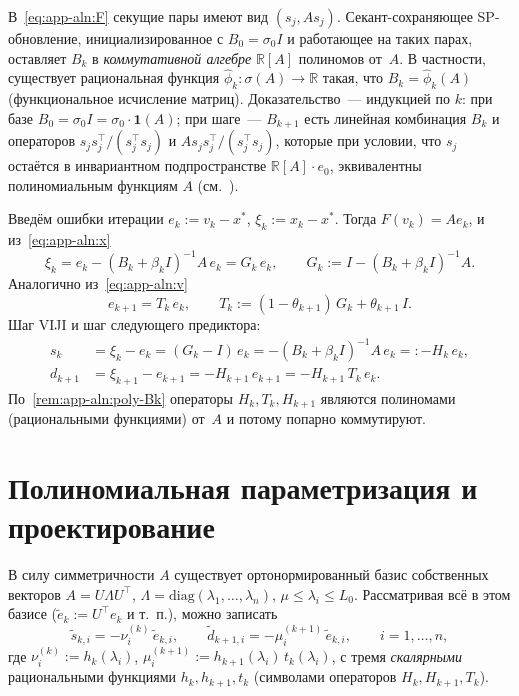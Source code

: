 \begin{remark}
\label{rem:app-aln:poly-Bk}
В~\eqref{eq:app-aln:F} секущие пары имеют вид $(s_j, A s_j)$.
Секант-сохраняющее SP-обновление,
ини\-циа\-ли\-зи\-ро\-ван\-ное с $B_0 = \sigma_0 I$
и работающее на таких парах, оставляет $B_k$ в \emph{коммутативной алгебре}
$\mathbb{R}[A]$ полиномов от~$A$. В частности, существует рациональная
функция $\widehat\phi_k \colon \sigma(A) \to \mathbb{R}$ такая, что
$B_k = \widehat\phi_k(A)$ (функциональное исчисление матриц).
Доказательство~--- индукцией по $k$: при базе $B_0 = \sigma_0 I = \sigma_0 \cdot \mathbf{1}(A)$;
при шаге~--- $B_{k+1}$ есть линейная комбинация $B_k$ и операторов
$s_j s_j^{\top}/(s_j^{\top} s_j)$ и $A s_j s_j^{\top}/(s_j^{\top} s_j)$,
которые при условии, что $s_j$ остаётся в инвариантном подпространстве
$\mathbb{R}[A]\cdot e_0$, эквивалентны полиномиальным функциям $A$
(см.~\cite[\S 2.4]{Greenbaum1997}).
\end{remark}

Введём ошибки итерации $e_k := v_k - x^{*}$, $\xi_k := x_k - x^{*}$.
Тогда $F(v_k) = A e_k$, и из~\eqref{eq:app-aln:x}
\begin{equation}
\xi_k = e_k - (B_k + \beta_k I)^{-1} A\, e_k = G_k\, e_k,
\qquad
G_k := I - (B_k + \beta_k I)^{-1} A.
\label{eq:app-aln:Gk}
\end{equation}
Аналогично из~\eqref{eq:app-aln:v}
\begin{equation}
e_{k+1} = T_k\, e_k,
\qquad
T_k := (1 - \theta_{k+1})\, G_k + \theta_{k+1}\, I.
\label{eq:app-aln:Tk}
\end{equation}
Шаг VIJI и шаг следующего предиктора:
\begin{align}
s_k &= \xi_k - e_k = (G_k - I)\, e_k = -(B_k + \beta_k I)^{-1} A\, e_k =: -H_k\, e_k, \label{eq:app-aln:sk}\\
d_{k+1} &= \xi_{k+1} - e_{k+1} = -H_{k+1}\, e_{k+1} = -H_{k+1}\, T_k\, e_k. \label{eq:app-aln:dk1}
\end{align}
По~\eqref{rem:app-aln:poly-Bk} операторы $H_k, T_k, H_{k+1}$ являются
полиномами (рациональными функциями) от~$A$ и потому попарно коммутируют.

\section{Полиномиальная параметризация и проектирование}
\label{sec:app-aln:proj}

В силу симметричности $A$ существует ортонормированный базис
собственных векторов $A = U \Lambda U^{\top}$, $\Lambda = \mathrm{diag}(\lambda_1, \ldots, \lambda_n)$,
$\mu \le \lambda_i \le L_0$. Рассматривая всё в этом базисе
($\tilde e_k := U^{\top} e_k$ и т.~п.), можно записать
\begin{equation}
\tilde s_{k,i} = -\nu_i^{(k)}\, \tilde e_{k,i},
\qquad
\tilde d_{k+1,i} = -\mu_i^{(k+1)}\, \tilde e_{k,i},
\qquad i = 1, \ldots, n,
\label{eq:app-aln:diag}
\end{equation}
где $\nu_i^{(k)} := h_k(\lambda_i)$, $\mu_i^{(k+1)} := h_{k+1}(\lambda_i)\, t_k(\lambda_i)$,
с тремя \emph{скалярными} рациональными функциями $h_k, h_{k+1}, t_k$
(символами операторов $H_k, H_{k+1}, T_k$).


